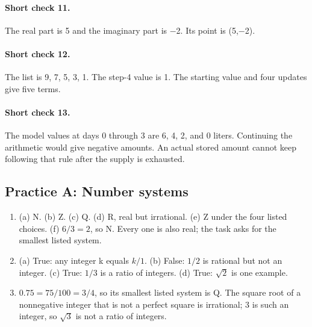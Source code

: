\documentclass[12pt,letterpaper]{article}
\begin{document}
\paragraph{Short check 11.}
The real part is 5 and the imaginary part is $-$2. Its point is (5,$-$2).


\paragraph{Short check 12.}
The list is 9, 7, 5, 3, 1. The step-4 value is 1. The starting value and four updates give five terms.


\paragraph{Short check 13.}
The model values at days 0 through 3 are 6, 4, 2, and 0 liters. Continuing the arithmetic would give negative amounts. An actual stored amount cannot keep following that rule after the supply is exhausted.



\subsection*{Practice A: Number systems}
\begin{enumerate}[label=A\arabic*.,leftmargin=2.5em,itemsep=10pt]
\item (a) N. (b) Z. (c) Q. (d) R, real but irrational. (e) Z under the four listed choices. (f) $6/3=2$, so N. Every one is also real; the task asks for the smallest listed system.
\item (a) True: any integer k equals $k/1$. (b) False: $1/2$ is rational but not an integer. (c) True: $1/3$ is a ratio of integers. (d) True: $\sqrt2$ is one example.
\item $0.75=75/100=3/4$, so its smallest listed system is Q. The square root of a nonnegative integer that is not a perfect square is irrational; 3 is such an integer, so $\sqrt3$ is not a ratio of integers.
\end{enumerate}
\end{document}
